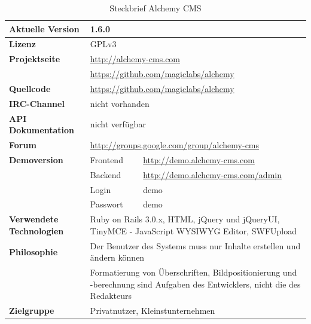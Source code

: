\begin{table}[!ht]
\caption{Steckbrief Alchemy CMS}
\label{table:alchemy}
\begin{tabular}[!ht]{|l|l|l|}
\hline
\textbf{Aktuelle Version} & \multicolumn{2}{p{10cm}|}{1.6.0} \\
\hline
\textbf{Lizenz} & \multicolumn{2}{p{10cm}|}{GPLv3} \\
\hline
\textbf{Projektseite} & \multicolumn{2}{p{10cm}|}{\href{http://alchemy-cms.com}{http://alchemy-cms.com}} \\
 & \multicolumn{2}{p{10cm}|}{\href{https://github.com/magiclabs/alchemy}{https://github.com/magiclabs/alchemy}} \\
\hline
\textbf{Quellcode} & \multicolumn{2}{p{10cm}|}{\href{https://github.com/magiclabs/alchemy}{https://github.com/magiclabs/alchemy}} \\
\hline
\textbf{IRC-Channel} & \multicolumn{2}{p{10cm}|}{nicht vorhanden} \\
\hline
\textbf{API Dokumentation} & \multicolumn{2}{p{10cm}|}{nicht verfügbar} \\
\hline
\textbf{Forum} & \multicolumn{2}{p{10cm}|}{\href{http://groups.google.com/group/alchemy-cms}{http://groups.google.com/group/alchemy-cms}} \\
\hline
\textbf{Demoversion} & Frontend & \href{http://demo.alchemy-cms.com}{http://demo.alchemy-cms.com} \\
\cline{2-3}
& Backend & \href{http://demo.alchemy-cms.com/admin}{http://demo.alchemy-cms.com/admin} \\
\cline{2-3}
& Login & demo \\
\cline{2-3}
& Passwort & demo \\
\hline
\textbf{Verwendete Technologien} & \multicolumn{2}{p{10cm}|}{Ruby on Rails 3.0.x, HTML, jQuery und jQueryUI, TinyMCE - JavaScript WYSIWYG Editor, SWFUpload} \\
\hline
\textbf{Philosophie} & \multicolumn{2}{p{10cm}|}{Der Benutzer des Systems muss nur Inhalte erstellen und ändern können} \\
& \multicolumn{2}{p{10cm}|}{Formatierung von Überschriften, Bildpositionierung und -berechnung sind Aufgaben des Entwicklers, nicht die des Redakteurs}\\
\hline
\textbf{Zielgruppe} & \multicolumn{2}{p{10cm}|}{Privatnutzer, Kleinstunternehmen} \\
\hline
\end{tabular}
\end{table}

